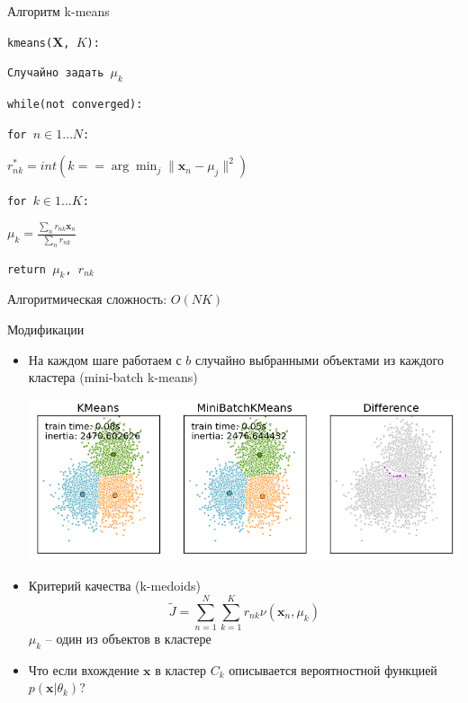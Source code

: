 \documentclass[10pt,a4paper]{beamer}
\begin{document}

\begin{frame}{Алгоритм k-means}

\texttt{kmeans($\mathbf{X}$, $K$):}

\texttt{\quad Случайно задать $\mu_k$}

\texttt{\quad while(not converged):}

\texttt{\quad\quad for $n \in 1\ldots N$:}

\texttt{\quad\quad\quad $r^*_{nk} = int(k == \arg \min_j \| \mathbf{x}_n - \mu_j\|^2)$}

\texttt{\quad\quad for $k \in 1\ldots K$:}

\texttt{\quad\quad\quad $\mu_k = \frac{\sum_n r_{nk} \mathbf{x}_n}{\sum_n r_{nk}}$}

\texttt{\quad return $\mu_k$, $r_{nk}$}

\vspace{1em}
Алгоритмическая сложность: $O(NK)$

\end{frame}


\begin{frame}{Модификации}

\begin{itemize}
\item На каждом шаге работаем с $b$ случайно выбранными объектами из каждого кластера (mini-batch k-means) \\
\begin{center}
\includegraphics[scale=0.35]{images/mbatch.png}
\end{center}
\item Критерий качества (k-medoids)
\[
\tilde J = \sum_{n=1}^N \sum_{k=1}^K r_{nk} \nu(\mathbf{x}_n, \mu_k)
\]
$\mu_k$ -- один из объектов в кластере
\item Что если вхождение $\mathbf{x}$ в кластер $C_k$ описывается вероятностной функцией $p(\mathbf{x} | \theta_k)$? 
\end{itemize}

\end{frame}
\end{document}
